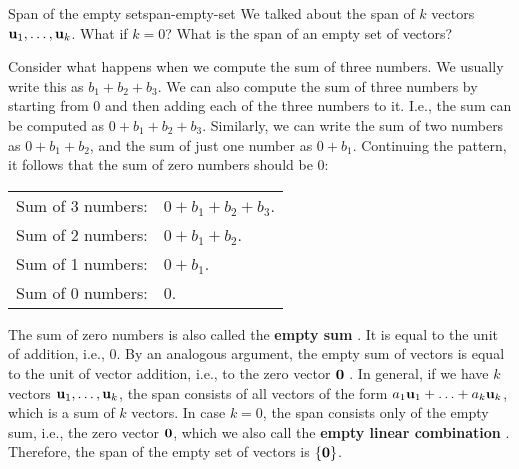 \begin{example}{Span of the empty set}{span-empty-set}
  We talked about the span of $k$ vectors
  $\mbox{\bf u}_1,\ldots,\mbox{\bf u}_k$.  What if $k=0$? What is
  the span of an empty set of vectors?
\end{example}

\begin{solution}
  Consider what happens when we compute the sum of three numbers. We
  usually write this as $b_1+b_2+b_3$. We can also compute the sum of
  three numbers by starting from $0$ and then adding each of the three
  numbers to it. I.e., the sum can be computed as
  $0+b_1+b_2+b_3$. Similarly, we can write the sum of two numbers as
  $0+b_1+b_2$, and the sum of just one number as $0+b_1$. Continuing
  the pattern, it follows that the sum of zero numbers should be $0$:
  \begin{center}
    \begin{tabular}{ll}
      Sum of 3 numbers: & $0+b_1+b_2+b_3$. \\
      Sum of 2 numbers: & $0+b_1+b_2$. \\
      Sum of 1 numbers: & $0+b_1$. \\
      Sum of 0 numbers: & $0$. \\
    \end{tabular}
  \end{center}
  The sum of zero numbers is also called the \textbf{empty sum}%
  . It is equal to the unit of addition, i.e., $0$.
  By an analogous argument, the empty sum of vectors is equal to the
  unit of vector addition, i.e., to the zero vector $\mbox{\bf 0}$%
  .  In general, if we
  have $k$ vectors $\mbox{\bf u}_1,\ldots,\mbox{\bf u}_k$, the span consists
  of all vectors of the form $a_1\mbox{\bf u}_1+\ldots+a_k\mbox{\bf u}_k$,
  which is a sum of $k$ vectors.  In case $k=0$, the span consists
  only of the empty sum, i.e., the zero vector $\mbox{\bf 0}$, which we
  also call the \textbf{empty linear combination}%
  . Therefore, the span of the empty
  set of vectors is $\left\{\mbox{\bf 0}\right\}$.
\end{solution}

